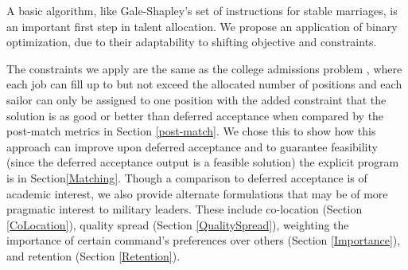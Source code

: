 A basic algorithm, like Gale-Shapley’s set of instructions for stable marriages, is an important first step in talent allocation. We propose an application of binary optimization, due to their adaptability to shifting objective and constraints.

The constraints we apply are the same as the college admissions problem \cite{1985_Roth}, where each job can fill up to but not exceed the allocated number of positions and each sailor can only be assigned to one position with the added constraint that the solution is as good or better than deferred acceptance when compared by the post-match metrics in Section \ref{post-match}. We chose this to show how this approach can improve upon deferred acceptance and to guarantee feasibility (since the deferred acceptance output is a feasible solution) the explicit program is in Section\ref{Matching}. Though a comparison to deferred acceptance is of academic interest, we also provide alternate formulations that may be of more pragmatic interest to military leaders. These include co-location (Section \ref{CoLocation}), quality spread (Section \ref{QualitySpread}), weighting the importance of certain command's preferences over others (Section \ref{Importance}), and retention (Section \ref{Retention}).

